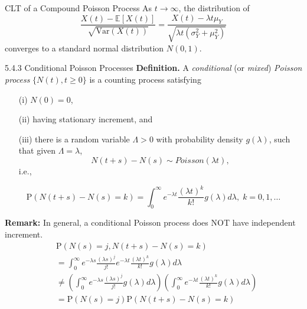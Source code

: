 \documentclass[letterpaper,handout, mathserif]{beamer}
\def\p{\mathrm P}
\def\E{\mathbb E}
\def\V{\mathrm{Var}}
\begin{document}
\begin{frame}{CLT of a Compound Poisson Process}
As $t\to\infty$, the distribution of
$$
\frac{X(t)-\E[X(t)]}{\sqrt{\V(X(t))}}
=\frac{X(t)-\lambda t\mu_Y}{\sqrt{\lambda t(\sigma^2_Y+\mu^2_Y)}}$$
converges to a standard normal distribution $N(0,1)$.
\end{frame}
\begin{frame}{5.4.3 Conditional Poisson Processes}
\mbox{}{\bf Definition.}
A {\em conditional} (or {\em mixed}) {\em Poisson process} $\{N(t), t\ge 0\}$ is a counting process satisfying
\begin{itemize}
\item [(i)] $N(0)=0$,
\item [(ii)] having stationary increment, and
\item [(iii)] there is a random variable $\Lambda>0$ with probability density $g(\lambda)$, such that
given $\Lambda=\lambda$,
$$N(t+s) - N(s)\sim Poisson(\lambda t),$$
i.e.,
\end{itemize}
$$\p(N(t+s)-N(s)=k)=\int_0^{\infty}e^{-\lambda t}\frac{(\lambda t)^k}{k!}g(\lambda)d\lambda, \;k=0,1,\ldots$$



\end{frame}
\begin{frame}
\noindent
\textbf{Remark:} In general, a conditional Poisson process does NOT have independent increment.
\begin{align*}
&\p(N(s)=j, N(t+s)-N(s)=k)\\
&=\int_0^{\infty}e^{-\lambda s}\frac{(\lambda s)^j}{j!}e^{-\lambda t}\frac{(\lambda t)^k}{k!}g(\lambda)d\lambda\\
&\neq\left(\int_0^{\infty}e^{-\lambda s}\frac{(\lambda s)^j}{j!}g(\lambda)d\lambda\right)
  \left(\int_0^{\infty}e^{-\lambda t}\frac{(\lambda t)^k}{k!}g(\lambda)d\lambda\right)\\
&= \p(N(s)=j)\p(N(t+s)-N(s)=k)\\
\end{align*}
\end{frame}
\end{document}
